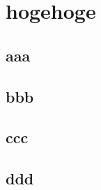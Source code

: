 \chapter{hogehoge}
\label{chap:hogehoge}

\section{aaa}

\section{bbb}

\section{ccc}

\section{ddd}

